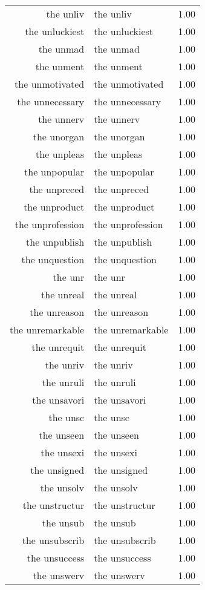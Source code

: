 \begin{table}[ht]
\begin{tabular}{rlr}
  the unliv & the unliv & 1.00 \\ 
  the unluckiest & the unluckiest & 1.00 \\ 
  the unmad & the unmad & 1.00 \\ 
  the unment & the unment & 1.00 \\ 
  the unmotivated & the unmotivated & 1.00 \\ 
  the unnecessary & the unnecessary & 1.00 \\ 
  the unnerv & the unnerv & 1.00 \\ 
  the unorgan & the unorgan & 1.00 \\ 
  the unpleas & the unpleas & 1.00 \\ 
  the unpopular & the unpopular & 1.00 \\ 
  the unpreced & the unpreced & 1.00 \\ 
  the unproduct & the unproduct & 1.00 \\ 
  the unprofession & the unprofession & 1.00 \\ 
  the unpublish & the unpublish & 1.00 \\ 
  the unquestion & the unquestion & 1.00 \\ 
  the unr & the unr & 1.00 \\ 
  the unreal & the unreal & 1.00 \\ 
  the unreason & the unreason & 1.00 \\ 
  the unremarkable & the unremarkable & 1.00 \\ 
  the unrequit & the unrequit & 1.00 \\ 
  the unriv & the unriv & 1.00 \\ 
  the unruli & the unruli & 1.00 \\ 
  the unsavori & the unsavori & 1.00 \\ 
  the unsc & the unsc & 1.00 \\ 
  the unseen & the unseen & 1.00 \\ 
  the unsexi & the unsexi & 1.00 \\ 
  the unsigned & the unsigned & 1.00 \\ 
  the unsolv & the unsolv & 1.00 \\ 
  the unstructur & the unstructur & 1.00 \\ 
  the unsub & the unsub & 1.00 \\ 
  the unsubscrib & the unsubscrib & 1.00 \\ 
  the unsuccess & the unsuccess & 1.00 \\ 
  the unswerv & the unswerv & 1.00 \\ 

\end{tabular}
\end{table}
